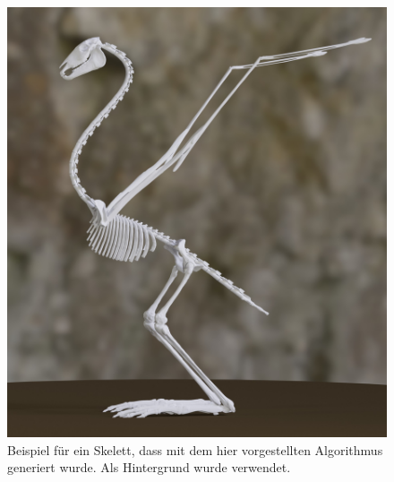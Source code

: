 \documentclass{thesisclass}
\begin{document}

\frontmatter
{}

\blankpage
{\pagestyle{empty}\null\newpage}


\begin{figure}
 \centering
 \includegraphics[width=\textwidth]{../java_skeleton_generation/example_skeletons/bird.jpg}
 \caption*{Beispiel für ein Skelett, dass mit dem hier vorgestellten Algorithmus generiert wurde. Als Hintergrund wurde \cite{background} verwendet.}
\end{figure}
\blankpage


\tableofcontents
\blankpage


\mainmatter
{}











\printbibliography[heading=bibintoc]

\begin{appendices}

\end{appendices}

\Erklaerung
\end{document}

